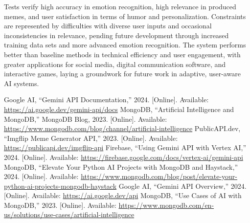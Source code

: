 \documentclass[conference]{IEEEtran}
\begin{document}
Tests verify high accuracy in emotion recognition, high relevance in produced memes, and user satisfaction in terms of humor and personalization. Constraints are represented by difficulties with diverse user inputs and occasional inconsistencies in relevance, pending future development through increased training data sets and more advanced emotion recognition. The system performs better than baseline methods in technical efficiency and user engagement, with greater applications for social media, digital communication software, and interactive games, laying a groundwork for future work in adaptive, user-aware AI systems.

%

\begin{thebibliography}{00}
 Google AI, “Gemini API Documentation,” 2024. [Online]. Available: \url{https://ai.google.dev/gemini-api/docs}
 MongoDB, “Artificial Intelligence and MongoDB,” MongoDB Blog, 2023. [Online]. Available: \url{https://www.mongodb.com/blog/channel/artificial-intelligence}
 PublicAPI.dev, “Imgflip Meme Generator API,” 2023. [Online]. Available: \url{https://publicapi.dev/imgflip-api}
 Firebase, “Using Gemini API with Vertex AI,” 2024. [Online]. Available: \url{https://firebase.google.com/docs/vertex-ai/gemini-api}
 MongoDB, “Elevate Your Python AI Projects with MongoDB and Haystack,” 2024. [Online]. Available: \url{https://www.mongodb.com/blog/post/elevate-your-python-ai-projects-mongodb-haystack}
 Google AI, “Gemini API Overview,” 2024. [Online]. Available: \url{https://ai.google.dev/api}
 MongoDB, “Use Cases of AI with MongoDB,” 2023. [Online]. Available: \url{https://www.mongodb.com/en-us/solutions/use-cases/artificial-intelligence}
\end{thebibliography}


\end{document}
